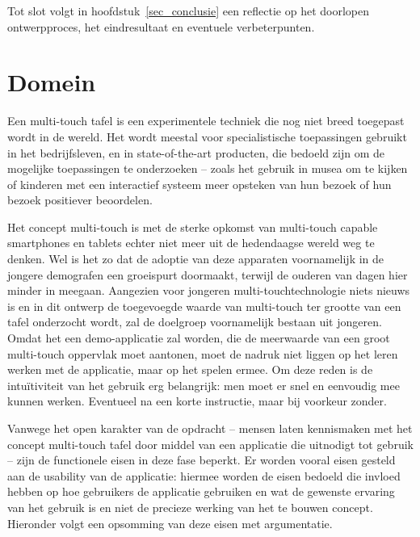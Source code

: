 \documentclass{acm}
\begin{document}
Tot slot volgt in hoofdstuk~\ref{sec_conclusie} een reflectie op het doorlopen ontwerpproces, het eindresultaat en eventuele verbeterpunten.

\section{Domein}
\label{sec_domein}
Een multi-touch tafel is een experimentele techniek die nog niet breed toegepast wordt in de wereld. Het wordt meestal voor specialistische toepassingen gebruikt in het bedrijfsleven, en in state-of-the-art producten, die bedoeld zijn om de mogelijke toepassingen te onderzoeken -- zoals het gebruik in musea om te kijken of kinderen met een interactief systeem meer opsteken van hun bezoek of hun bezoek positiever beoordelen.

Het concept multi-touch is met de sterke opkomst van multi-touch capable smartphones en tablets echter niet meer uit de hedendaagse wereld weg te denken. Wel is het zo dat de adoptie van deze apparaten voornamelijk in de jongere demografen een groeispurt doormaakt, terwijl de ouderen van dagen hier minder in meegaan. Aangezien voor jongeren multi-touchtechnologie niets nieuws is en in dit ontwerp de toegevoegde waarde van multi-touch ter grootte van een tafel onderzocht wordt, zal de doelgroep voornamelijk bestaan uit jongeren. Omdat het een demo-applicatie zal worden, die de meerwaarde van een groot multi-touch oppervlak moet aantonen, moet de nadruk niet liggen op het leren werken met de applicatie, maar op het spelen ermee. Om deze reden is de intu\"itiviteit van het gebruik erg belangrijk: men moet er snel en eenvoudig mee kunnen werken. Eventueel na een korte instructie, maar bij voorkeur zonder.

Vanwege het open karakter van de opdracht -- mensen laten kennismaken met het concept multi-touch tafel door middel van een applicatie die uitnodigt tot gebruik -- zijn de functionele eisen in deze fase beperkt. Er worden vooral eisen gesteld aan de usability van de applicatie: hiermee worden de eisen bedoeld die invloed hebben op hoe gebruikers de applicatie gebruiken en wat de gewenste ervaring van het gebruik is en niet de precieze werking van het te bouwen concept. Hieronder volgt een opsomming van deze eisen met argumentatie.
\end{document}
